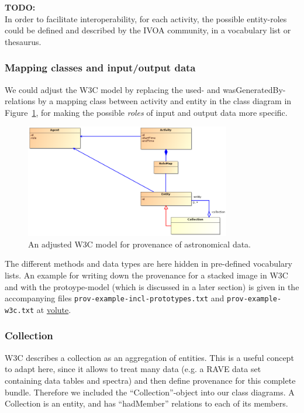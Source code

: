 \documentclass[11pt,a4paper]{ivoa}
\newcommand{\TODO}[1]{%
    \noindent%
    \colorbox{todocolor}{%
            \parbox{0.85\linewidth}{\sffamily \textbf{TODO:}\\
            #1}
    }%
    \vspace{2pt}

}
\begin{document}
\TODO{In order to facilitate interoperability, for each activity, the possible entity-roles could be defined and described by the IVOA community, in a vocabulary list or thesaurus.}


\subsubsection{Mapping classes and input/output data}
We could adjust the W3C model by 
replacing the used- and wasGeneratedBy-relations by a mapping class between activity and entity in the class diagram in Figure~\ref{fig:classes-w3c-adjusted}, for making the possible \emph{roles} of input and output data more specific.

\begin{figure}
\centering
\includegraphics[width=0.8\textwidth]{ProvDM-W3C-adjusted.png}
\caption{An adjusted W3C model for provenance of astronomical data.}
\label{fig:classes-w3c-adjusted}
\end{figure}


The different methods and data types are here hidden in pre-defined vocabulary lists. 
An example for writing down the provenance for a stacked image in W3C and with the protoype-model (which is discussed in a later section) is given in the accompanying files 
\texttt{prov-example-incl-prototypes.txt} and 
\texttt{prov-example-w3c.txt} at \href{https://volute.g-vo.org/svn/trunk/projects/dm/provenance/description/}{volute}.




\subsubsection{Collection}
W3C describes a collection as an aggregation of entities. This is a useful concept to adapt here, since it allows to treat many data (e.g. a RAVE data set containing data tables and spectra) and then define provenance for this complete bundle. Therefore we included the ``Collection''-object into our class diagrams. A Collection is an entity, and has ``hadMember'' relations to each of its members.
\end{document}
